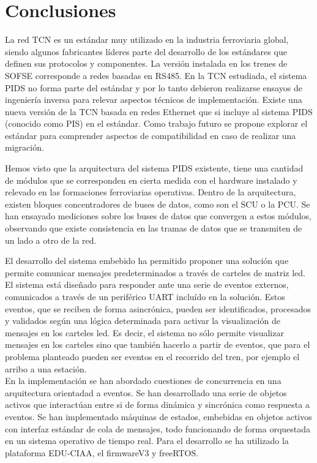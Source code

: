 
\chapter{Conclusiones} %

La red TCN es un estándar muy utilizado en la industria ferroviaria global, siendo algunos fabricantes líderes parte del desarrollo de los estándares que definen sus protocolos y componentes. La versión instalada en los trenes de SOFSE corresponde a redes basadas en RS485. En la TCN estudiada, el sistema PIDS no forma parte del estándar y por lo tanto debieron realizarse ensayos de ingeniería inversa para relevar aspectos técnicos de implementación. Existe una nueva versión de la TCN basada en redes Ethernet que si incluye al sistema PIDS (conocido como PIS) en el estándar. Como trabajo futuro se propone explorar el estándar para comprender aspectos de compatibilidad en caso de realizar una migración.

Hemos visto que la arquitectura del sistema PIDS existente, tiene una cantidad de módulos que se corresponden en cierta medida con el hardware instalado y relevado en las formaciones ferroviarias operativas. Dentro de la arquitectura, existen bloques concentradores de buses de datos, como son el SCU o la PCU. Se han ensayado mediciones sobre los buses de datos que convergen a estos módulos, observando que existe consistencia en las tramas de datos que se transmiten de un lado a otro de la red.

El desarrollo del sistema embebido ha permitido proponer una solución que permite comunicar mensajes predeterminados a través de carteles de matriz led. El sistema está diseñado para responder ante una serie de eventos externos, comunicados a través de un periférico UART incluído en la solución. Estos eventos, que se reciben de forma asincrónica, pueden ser identificados, procesados y validados según una lógica determinada para activar la visualización de mensajes en los carteles led. Es decir, el sistema no sólo permite visualizar mensajes en los carteles sino que también hacerlo a partir de eventos, que para el problema planteado pueden ser eventos en el recorrido del tren, por ejemplo el arribo a una estación. \\

En la implementación se han abordado cuestiones de concurrencia en una arquitectura orientadad a eventos. Se han desarrollado una serie de objetos activos que interactúan entre si de forma dinámica y sincrónica como respuesta a eventos. Se han implementado máquinas de estados, embebidas en objetos activos con interfaz estándar de cola de mensajes, todo funcionando de forma orquestada en un sistema operativo de tiempo real. Para el desarrollo se ha utilizado la plataforma EDU-CIAA, el firmwareV3 y freeRTOS.\\


